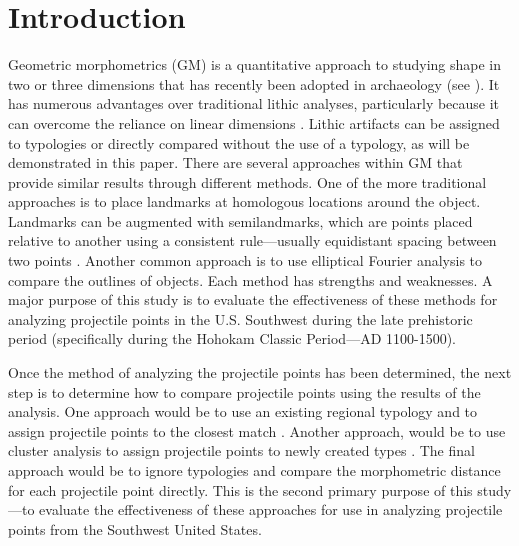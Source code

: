 \documentclass[PCJ,Unicode,screen,mode=plain]{cedram}
\begin{document}
\tableofcontents

\section*{Introduction}

Geometric morphometrics (GM) is a quantitative approach to studying shape in two or three dimensions that has recently been adopted in archaeology (see \autocite[for overviews]{MacLeod2017-yl,Okumura2019-ur,Shott2010-fn}). It has numerous advantages over traditional lithic analyses, particularly because it can overcome the reliance on linear dimensions \autocite[~196-197]{Shott2010-fn}. Lithic artifacts can be assigned to typologies or directly compared without the use of a typology, as will be demonstrated in this paper. There are several approaches within GM that provide similar results through different methods. One of the more traditional approaches is to place landmarks at homologous locations around the object. Landmarks can be augmented with semilandmarks, which are points placed relative to another using a consistent rule---usually equidistant spacing between two points \autocite[2-4]{Okumura2019-ur}. Another common approach is to use elliptical Fourier analysis to compare the outlines of objects. Each method has strengths and weaknesses. A major purpose of this study is to evaluate the effectiveness of these methods for analyzing projectile points in the U.S. Southwest during the late prehistoric period (specifically during the Hohokam Classic Period---AD 1100-1500).

Once the method of analyzing the projectile points has been determined, the next step is to determine how to compare projectile points using the results of the analysis. One approach would be to use an existing regional typology and to assign projectile points to the closest match \autocite[e.g.,]{Kocer2017-au}. Another approach, would be to use cluster analysis to assign projectile points to newly created types \autocites[e.g.,][]{Petrik2018-pd,Matzig2021-id}. The final approach would be to ignore typologies and compare the morphometric distance for each projectile point directly. This is the second primary purpose of this study---to evaluate the effectiveness of these approaches for use in analyzing projectile points from the Southwest United States.
\end{document}
